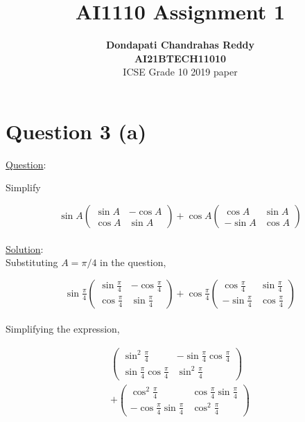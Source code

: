 \documentclass[journal,12pt,twocolumn]{IEEEtran}
\newcommand{\myvec}[1]{\ensuremath{\begin{pmatrix}#1\end{pmatrix}}}
\begin{document}
\title{\textbf{AI1110 Assignment 1} }
\author{\textbf{Dondapati Chandrahas Reddy}\\ \textbf{AI21BTECH11010}\\ ICSE Grade 10 2019 paper}

\maketitle

\section {Question 3 (a) \newline}

{\large \underline{Question}:\newline}

Simplify

\begin{equation}
	\sin A\myvec{\sin A &  -\cos A \\ \cos A & \sin A} + \cos A \myvec{\cos A &  \sin A \\ -\sin A & \cos A}
\end{equation}\\

{\large \underline{Solution}:}\\

Substituting $A = \pi/4$ in the question,

\begin{equation}
	\sin \tfrac{\pi}{4}\myvec{\sin \tfrac{\pi}{4} &  -\cos \tfrac{\pi}{4} \\ \cos \tfrac{\pi}{4} & \sin \tfrac{\pi}{4}} + \cos \tfrac{\pi}{4} \myvec{\cos \tfrac{\pi}{4} &  \sin \tfrac{\pi}{4} \\ -\sin \tfrac{\pi}{4} & \cos \tfrac{\pi}{4}}
\end{equation}\\

Simplifying the expression,

\begin{multline}
	\myvec{\sin^2 \tfrac{\pi}{4} &  -\sin \tfrac{\pi}{4}\cos \tfrac{\pi}{4} \\[1ex] \sin \tfrac{\pi}{4}\cos \tfrac{\pi}{4} & \sin^2 \tfrac{\pi}{4}} \\[1ex] 
	+ \myvec{\cos^2 \tfrac{\pi}{4} & \cos \tfrac{\pi}{4}\sin \tfrac{\pi}{4} \\[1ex] -\cos \tfrac{\pi}{4}\sin \tfrac{\pi}{4} & \cos^2 \tfrac{\pi}{4}}
\end{multline}\\
\end{document}
